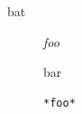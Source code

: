 
\def\mytitle{Nested Definition Lists}


\begin{description}
\item[bat]
\emph{foo}

bar

\begin{verbatim}
*foo*
\end{verbatim}
\end{description}


